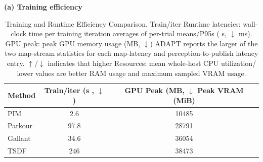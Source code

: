 \documentclass[letterpaper, 10 pt, conference]{ieeeconf/ieeeconf}
\providecommand{\DIFadd}[1]{{\protect\color{blue} \sf #1}} %
\providecommand{\DIFdel}[1]{{\protect\color{red} \scriptsize #1}} %
\providecommand{\DIFaddFL}[1]{\DIFadd{#1}} %
\providecommand{\DIFdelFL}[1]{\DIFdel{#1}} %
\providecommand{\DIFaddbeginFL}{} %
\providecommand{\DIFaddendFL}{} %
\providecommand{\DIFdelbeginFL}{} %
\providecommand{\DIFdelendFL}{} %
\begin{document}
\begin{table}[t]
\DIFaddendFL \centering
\caption{Training \DIFaddbeginFL \DIFaddFL{and Runtime }\DIFaddendFL Efficiency\DIFdelbeginFL \DIFdelFL{Comparison}\DIFdelendFL . \DIFdelbeginFL \DIFdelFL{Train/iter}\DIFdelendFL \DIFaddbeginFL \DIFaddFL{Runtime latencies}\DIFaddendFL : \DIFdelbeginFL \DIFdelFL{wall-clock time per training iteration }\DIFdelendFL \DIFaddbeginFL \DIFaddFL{averages of per-trial means/P95s }\DIFaddendFL (\DIFdelbeginFL \DIFdelFL{s, $\downarrow$}\DIFdelendFL \DIFaddbeginFL \DIFaddFL{ms}\DIFaddendFL ). \DIFdelbeginFL \DIFdelFL{GPU peak: peak GPU memory usage (MB, $\downarrow$)}\DIFdelendFL \DIFaddbeginFL \DIFaddFL{ADAPT reports the larger of the two map-stream statistics for each map-latency and perception-to-publish latency entry}\DIFaddendFL . \DIFdelbeginFL \DIFdelFL{$\uparrow$/$\downarrow$ indicates that higher}\DIFdelendFL \DIFaddbeginFL \DIFaddFL{Resources: mean whole-host CPU utilization}\DIFaddendFL /\DIFdelbeginFL \DIFdelFL{lower values are better}\DIFdelendFL \DIFaddbeginFL \DIFaddFL{RAM usage and maximum sampled VRAM usage}\DIFaddendFL .}
\label{tab:efficiency}
\DIFaddbeginFL \small
\DIFaddendFL \setlength{\tabcolsep}{6pt}
\DIFdelbeginFL %
\DIFdelendFL \DIFaddbeginFL \DIFaddFL{\textbf{(a) Training efficiency}}\\[3pt]
\DIFaddendFL \begin{tabular}{lcc}
\toprule[1.0pt]
Method & Train/iter (s\DIFdelbeginFL \DIFdelFL{, $\downarrow$}\DIFdelendFL ) & \DIFdelbeginFL \DIFdelFL{GPU Peak (MB, $\downarrow$}\DIFdelendFL \DIFaddbeginFL \DIFaddFL{Peak VRAM (MiB}\DIFaddendFL ) \\
\midrule[0.8pt]
PIM~\cite{long2025learning} & 2.6 & 10485 \DIFdelbeginFL %
\DIFdelendFL \DIFaddbeginFL \\
\DIFaddendFL Parkour~\cite{zhuang2024humanoid} & 97.8 & 28791 \DIFdelbeginFL %
\DIFdelendFL \DIFaddbeginFL \\
\DIFaddendFL Gallant~\cite{Ben_2025_Gallant} & 34.6 & 36054 \DIFdelbeginFL %
\DIFdelendFL \DIFaddbeginFL \\
\DIFaddendFL TSDF & 246 & 38473 \DIFdelbeginFL %
\DIFdelendFL \DIFaddbeginFL \\

\end{tabular}
\end{table}
\end{document}
